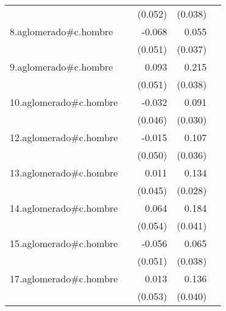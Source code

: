 {\begin{longtable}{l*{4}{D{.}{.}{-1}}}
            &                     &     (0.052)         &     (0.038)         &                     \\
\addlinespace
8.aglomerado#c.hombre&                     &      -0.068         &       0.055         &                     \\
            &                     &     (0.051)         &     (0.037)         &                     \\
\addlinespace
9.aglomerado#c.hombre&                     &       0.093         &       0.215\sym{***}&                     \\
            &                     &     (0.051)         &     (0.038)         &                     \\
\addlinespace
10.aglomerado#c.hombre&                     &      -0.032         &       0.091\sym{**} &                     \\
            &                     &     (0.046)         &     (0.030)         &                     \\
\addlinespace
12.aglomerado#c.hombre&                     &      -0.015         &       0.107\sym{**} &                     \\
            &                     &     (0.050)         &     (0.036)         &                     \\
\addlinespace
13.aglomerado#c.hombre&                     &       0.011         &       0.134\sym{***}&                     \\
            &                     &     (0.045)         &     (0.028)         &                     \\
\addlinespace
14.aglomerado#c.hombre&                     &       0.064         &       0.184\sym{***}&                     \\
            &                     &     (0.054)         &     (0.041)         &                     \\
\addlinespace
15.aglomerado#c.hombre&                     &      -0.056         &       0.065         &                     \\
            &                     &     (0.051)         &     (0.038)         &                     \\
\addlinespace
17.aglomerado#c.hombre&                     &       0.013         &       0.136\sym{***}&                     \\
            &                     &     (0.053)         &     (0.040)         &                     \\

\end{longtable}}

